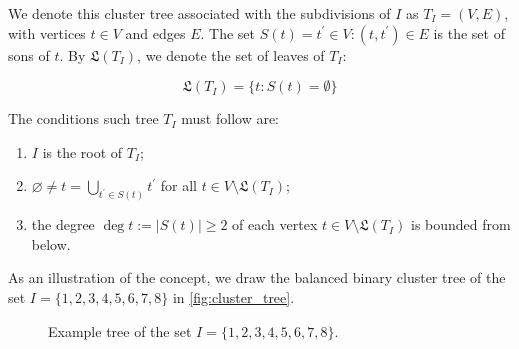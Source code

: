 We denote this cluster tree associated with the subdivisions of $I$ as $T_{I} = (V,E)$, with vertices $t \in V$ and edges $E$. The set $S(t)={t^{'} \in V : (t,t^{'})\in E}$ is the set of sons of $t$. By $\mathfrak{L}(T_{I})$, we denote the set of leaves of $T_{I}$:

\begin{equation}
    \mathfrak{L}(T_{I}) = \{ t : S(t) = \emptyset \}
\end{equation}

The conditions such tree $T_{I}$ must follow are:

\begin{enumerate}
    \item $I$ is the root of $T_{I}$;
    \item $\varnothing \neq t = \bigcup_{t^{'} \in S(t)} t^{'} $ for all $t \in V \setminus   \mathfrak{L}(T_{I}) $;
    \item the degree $\deg t := |S(t)| \geq 2$ of each vertex $t \in V \setminus \mathfrak{L}(T_{I})$ is bounded from below.
\end{enumerate}

As an illustration of the concept, we draw the balanced binary cluster tree of the set $I=\{1,2,3,4,5,6,7,8\}$ in \autoref{fig:cluster_tree}.

\begin{figure}[!h]

    \centering

    \caption{Example tree of the set $I=\{1,2,3,4,5,6,7,8\}$.}
    \label{fig:cluster_tree}
\end{figure}

